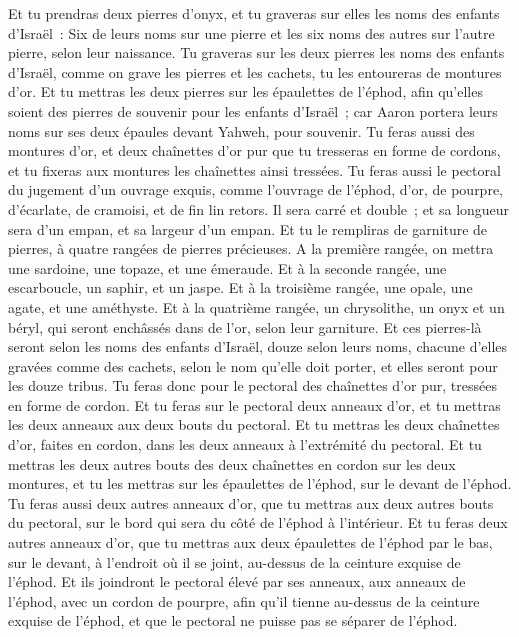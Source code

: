 \begin{multicols}{2}
Et tu prendras deux pierres d'onyx, et tu graveras sur elles les noms des enfants d'Israël~:
Six de leurs noms sur une pierre et les six noms des autres sur l'autre pierre, selon leur naissance.
Tu graveras sur les deux pierres les noms des enfants d'Israël, comme on grave les pierres et les cachets, tu les entoureras de montures d'or.
Et tu mettras les deux pierres sur les épaulettes de l'éphod, afin qu'elles soient des pierres de souvenir pour les enfants d'Israël~; car Aaron portera leurs noms sur ses deux épaules devant Yahweh, pour souvenir.
Tu feras aussi des montures d'or,
et deux chaînettes d'or pur que tu tresseras en forme de cordons, et tu fixeras aux montures les chaînettes ainsi tressées.
Tu feras aussi le pectoral du jugement d'un ouvrage exquis, comme l'ouvrage de l'éphod, d'or, de pourpre, d'écarlate, de cramoisi, et de fin lin retors.
Il sera carré et double~; et sa longueur sera d'un empan, et sa largeur d'un empan.
Et tu le rempliras de garniture de pierres, à quatre rangées de pierres précieuses. A la première rangée, on mettra une sardoine, une topaze, et une émeraude.
Et à la seconde rangée, une escarboucle, un saphir, et un jaspe.
Et à la troisième rangée, une opale, une agate, et une améthyste.
Et à la quatrième rangée, un chrysolithe, un onyx et un béryl, qui seront enchâssés dans de l'or, selon leur garniture.
Et ces pierres-là seront selon les noms des enfants d'Israël, douze selon leurs noms, chacune d'elles gravées comme des cachets, selon le nom qu'elle doit porter, et elles seront pour les douze tribus.
Tu feras donc pour le pectoral des chaînettes d'or pur, tressées en forme de cordon.
Et tu feras sur le pectoral deux anneaux d'or, et tu mettras les deux anneaux aux deux bouts du pectoral.
Et tu mettras les deux chaînettes d'or, faites en cordon, dans les deux anneaux à l'extrémité du pectoral.
Et tu mettras les deux autres bouts des deux chaînettes en cordon sur les deux montures, et tu les mettras sur les épaulettes de l'éphod, sur le devant de l'éphod.
Tu feras aussi deux autres anneaux d'or, que tu mettras aux deux autres bouts du pectoral, sur le bord qui sera du côté de l'éphod à l'intérieur.
Et tu feras deux autres anneaux d'or, que tu mettras aux deux épaulettes de l'éphod par le bas, sur le devant, à l'endroit où il se joint, au-dessus de la ceinture exquise de l'éphod.
Et ils joindront le pectoral élevé par ses anneaux, aux anneaux de l'éphod, avec un cordon de pourpre, afin qu'il tienne au-dessus de la ceinture exquise de l'éphod, et que le pectoral ne puisse pas se séparer de l'éphod.

\end{multicols}
